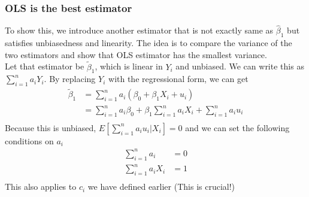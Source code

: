 \documentclass[12pt]{article}
\theoremstyle{definition}
\theoremstyle{property}
\theoremstyle{assumption}
\theoremstyle{example}
\theoremstyle{comment}
\begin{document}
\subsubsection{OLS is the best estimator}
To show this, we introduce another estimator that is not exactly same as $\hat{\beta}_1$ but satisfies unbiasedness and linearity. The idea is to compare the variance of the two estimators and show that OLS estimator has the smallest variance. 
\\
Let that estimator be $\tilde{\beta}_1$, which is linear in $Y_i$ and unbiased. We can write this as $\sum_{i=1}^n a_iY_i$. By replacing $Y_i$ with the regressional form, we can get
\[
\begin{aligned}
\tilde{\beta}_1 &= \sum_{i=1}^n a_i(\beta_0+\beta_1X_i+u_i)\\
&= \sum_{i=1}^n a_i\beta_0+\beta_1\sum_{i=1}^na_iX_i+\sum_{i=1}^na_iu_i \\
\end{aligned}
\] 
Because this is unbiased, $E[\sum_{i=1}^n a_iu_i|X_i]=0$ and we can set the following conditions on $a_i$
\[
\begin{aligned}
 \sum_{i=1}^n a_i&=0 \\
 \sum_{i=1}^n a_iX_i&=1 \\
\end{aligned}
\]
This also applies to $c_i$ we have defined earlier (This is crucial!)
\\
\end{document}
